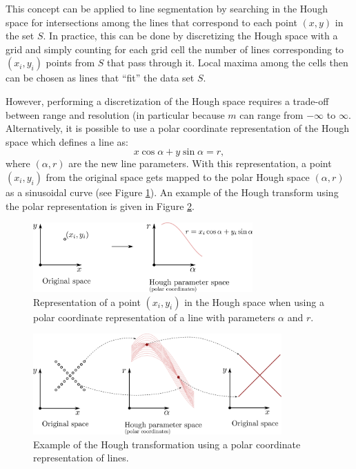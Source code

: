 This concept can be applied to line segmentation by searching in the Hough space for intersections among the lines that correspond to each point $(x,y)$ in the set $S$. In practice, this can be done by discretizing the Hough space with a grid and simply counting for each grid cell the number of lines corresponding to $(x_i,y_i)$ points from $S$ that pass through it. Local maxima among the cells then can be chosen as lines that ``fit'' the data set $S$.

However, performing a discretization of the Hough space requires a trade-off between range and resolution (in particular because $m$ can range from $-\infty$ to $\infty$. Alternatively, it is possible to use a polar coordinate representation of the Hough space which defines a line as:
\begin{equation*}
x \cos \alpha + y \sin \alpha = r,
\end{equation*}
where $(\alpha,r)$ are the new line parameters. With this representation, a point $(x_i,y_i)$ from the original space gets mapped to the polar Hough space $(\alpha,r)$ as a sinusoidal curve (see Figure \ref{fig:hough3}). An example of the Hough transform using the polar representation is given in Figure \ref{fig:hough4}.
\begin{figure}
\centering
	\includegraphics[width=0.75\textwidth]{tex/figs/ch12_fig/hough3.png}
	\caption{Representation of a point $(x_i, y_i)$ in the Hough space when using a polar coordinate representation of a line with parameters $\alpha$ and $r$.}
	\label{fig:hough3}
\end{figure}
\begin{figure}
\centering
	\includegraphics[width=0.85\textwidth]{tex/figs/ch12_fig/hough4.png}
	\caption{Example of the Hough transformation using a polar coordinate representation of lines.}
	\label{fig:hough4}
\end{figure}

